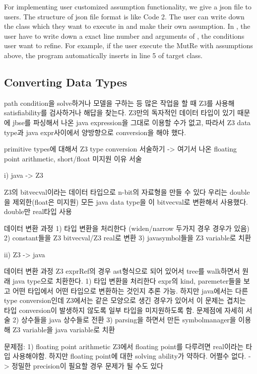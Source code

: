 \documentclass{article}
\begin{document}
For implementing user customized assumption functionality, we give a json file to users. The structure of json file format is like \textsf{\small Code 2}. The user can write down the class which they want to execute in  and make their own assumption. In , the user have to write down a exact line number and arguments of , the conditions user want to refine. For example, if the user execute the MutRe with assumptions above, the program automatically inserts  in line 5 of target class.

\subsection{Converting Data Types}

\iffalse
path condition을 solve하거나 모델을 구하는 등 많은 작업을 할 때 Z3를 사용해 satisfiability를 검사하거나 해답을 찾는다. Z3만의 독자적인 데이터 타입이 있기 때문에 jbse를 파싱해서 나온 java expression을 그대로 이용할 수가 없고, 따라서 Z3 data type과 java expr사이에서 양방향으로 conversion을 해야 했다.

primitive types에 대해서 Z3 type conversion 서술하기
-> 여기서 나온 floating point arithmetic, short/float 미지원 이유 서술

i) java -> Z3

Z3의 bitvecval이라는 데이터 타입으로 n-bit의 자료형을 만들 수 있다
우리는 double을 제외한(float은 미지원) 모든 java data type을 이 bitvecval로 변환해서 사용했다.
double만 real타입 사용

데이터 변환 과정
  1) 타입 변환을 처리한다 (widen/narrow 두가지 경우 경우가 있음)
  2) constant들을 Z3 bitvecval/Z3 real로 변환
  3) javasymbol들을 Z3 variable로 치환

ii) Z3 -> java

데이터 변환 과정
  Z3 exprRef의 경우 ast형식으로 되어 있어서 tree를 walk하면서 원래 java type으로 치환한다.
  1) 타입 변환을 처리한다 
    expr의 kind, paremeter들을 보고 어떤 타입에서 어떤 타입으로 변환하는 것인지 추론 가능.
    하지만 java에서는 다른 type conversion인데 Z3에서는 같은 모양으로 생긴 경우가 있어서 이 문제는 겹치는 타입 conversion이 발생하지 않도록 일부 타입을 미지원하도록 함. 문제점에 자세히 서술
  2) 상수들을 java 상수들로 전환
  3) parsing을 하면서 만든 symbolmanager을 이용해 Z3 variable을 java variable로 치환

문제점:
1) floating point arithmetic
Z3에서 floating point를 다루려면 real이라는 타입 사용해야함. 하지만 floating point에 대한 solving ability가 약하다.
어쩔수 없다.  -> 정밀한 precision이 필요할 경우 문제가 될 수도 있다
\end{document}

